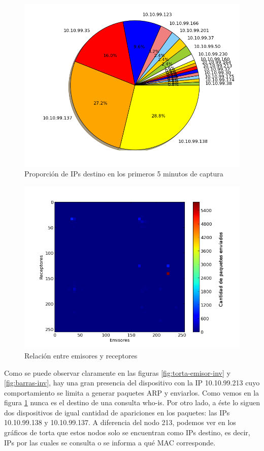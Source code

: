 \begin{figure}[!h]
  \includegraphics[width=\textwidth,keepaspectratio]{graph/receptores_somodi.png}
  \caption{Proporción de IPs destino en los primeros 5 minutos de captura}
  \label{fig:torta-receptor-inv}
\end{figure}

\begin{figure}[!h]
  \includegraphics[width=\textwidth,keepaspectratio]{graph/hist2d-invgate.png}
  \caption{Relación entre emisores y receptores}
  \label{fig:hist2d-inv}
\end{figure}

Como se puede observar claramente en las figuras \ref{fig:torta-emisor-inv} y  
\ref{fig:barras-inv}, hay una gran presencia del dispositivo con la IP 10.10.99.213 cuyo comportamiento se limita a generar paquetes ARP y enviarlos. Como vemos en la figura \ref{fig:torta-receptor-inv} nunca es el destino de una consulta who-is. Por otro lado, a éste lo siguen dos dispositivos de igual cantidad de apariciones en los paquetes: las IPs 10.10.99.138 y 10.10.99.137. A diferencia del nodo 213, podemos ver en los gráficos de torta que estos nodos solo se encuentran como IPs destino, es decir, IPs por las cuales se consulta o se informa a qué MAC corresponde.

